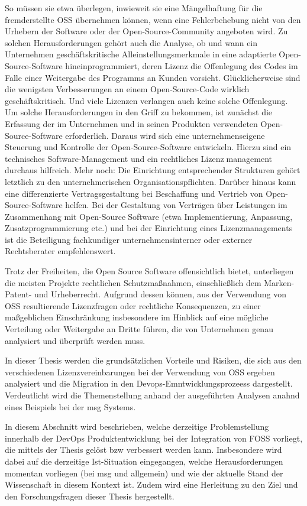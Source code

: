 So müssen sie etwa überlegen, inwieweit sie eine Mängelhaftung für die fremderstellte OSS 
übernehmen können, wenn eine Fehlerbehebung nicht von den Urhebern der Software oder 
der Open-Source-Community angeboten wird. Zu solchen Herausforderungen gehört auch die 
Analyse, ob und wann ein Unternehmen geschäftskritische Alleinstellungsmerkmale in eine 
adaptierte Open-Source-Software hineinprogrammiert, deren Lizenz die Offenlegung des Codes 
im Falle einer Weitergabe des Programms an Kunden vorsieht. Glücklicherweise sind die 
wenigsten Verbesserungen an einem Open-Source-Code wirklich geschäftskritisch. Und viele 
Lizenzen verlangen auch keine solche Offenlegung. Um solche Herausforderungen in den Griff zu bekommen, ist zunächst die Erfassung der im 
Unternehmen und in seinen Produkten verwendeten Open-Source-Software erforderlich. 
Daraus wird sich eine unternehmenseigene Steuerung und Kontrolle der Open-Source-Software 
entwickeln. Hierzu sind ein technisches Software-Management und ein rechtliches Lizenzmanagement durchaus hilfreich. Mehr noch: Die Einrichtung entsprechender Strukturen gehört 
letztlich zu den unternehmerischen Organisationspflichten. Darüber hinaus kann eine 
differenzierte Vertragsgestaltung bei Beschaffung und Vertrieb von Open-Source-Software 
helfen. Bei der Gestaltung von Verträgen über Leistungen im Zusammenhang mit Open-SourceSoftware (etwa Implementierung, Anpassung, Zusatzprogrammierung etc.) und bei der 
Einrichtung eines Lizenzmanagements ist die Beteiligung fachkundiger unternehmensinterner 
oder externer Rechtsberater empfehlenswert.

Trotz der Freiheiten, die Open Source Software offensichtlich bietet, unterliegen die meisten Projekte rechtlichen Schutzmaßnahmen, einschließlich dem Marken- Patent- und Urheberrecht. Aufgrund dessen können, aus der Verwendung von OSS resultierende Lizenzfragen oder rechtliche Konsequenzen, zu einer maßgeblichen Einschränkung insbesondere im Hinblick auf eine mögliche Verteilung oder Weitergabe an Dritte führen, die von Unternehmen genau analysiert und überprüft werden muss.  

In dieser Thesis werden die grundsätzlichen Vorteile und Risiken, die sich aus den verschiedenen Lizenzvereinbarungen bei der Verwendung von OSS ergeben analysiert und die Migration in den Devops-Emntwicklungsprozeess dargestellt. Verdeutlicht wird die Themenstellung anhand der ausgeführten Analysen anahnd eines Beispiels bei der msg Systems.

In diesem Abschnitt wird beschrieben, welche derzeitige Problemstellung innerhalb der DevOps Produktentwicklung bei der Integration von FOSS vorliegt, die mittels der Thesis gelöst bzw verbessert werden kann. Insbesondere wird dabei auf die derzeitige Ist-Situation eingegangen, welche Herausforderungen momentan vorliegen (bei msg und allgemein) und wie der aktuelle Stand der Wissenschaft in diesem Kontext ist. 
Zudem wird eine Herleitung zu den Ziel und den Forschungsfragen dieser Thesis hergestellt.  